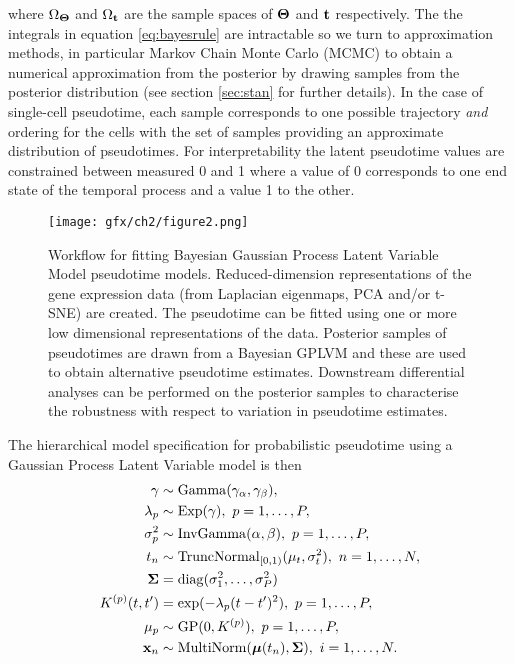 where $\Omega_{\bm{\Theta}}$ and $\Omega_{\mathbf{t}}$ are the sample spaces of $\bm{\Theta}$ and $\mathbf{t}$ respectively. The the integrals in equation \ref{eq:bayesrule} are intractable so we turn to approximation methods, in particular Markov Chain Monte Carlo (MCMC) to obtain a numerical approximation from the posterior by drawing samples from the posterior distribution (see section \ref{sec:stan} for further details). In the case of single-cell pseudotime, each sample corresponds to one possible trajectory \emph{and} ordering for the cells with the set of samples providing an approximate distribution of pseudotimes. For interpretability the latent pseudotime values are constrained between measured 0 and 1 where a value of 0 corresponds to one end state of the temporal process and a value 1 to the other.

\begin{figure}
\centering
  \texttt{[image: gfx/ch2/figure2.png]}
  \caption[Workflow for fitting Bayesian Gaussian Process Latent Variable Model pseudotime models.]{Workflow for fitting Bayesian Gaussian Process Latent Variable Model pseudotime models. Reduced-dimension representations of the gene expression data (from Laplacian eigenmaps, PCA and/or t-SNE) are created. The pseudotime can be fitted using one or more low dimensional representations of the data. Posterior samples of pseudotimes are drawn from a Bayesian GPLVM and these are used to obtain alternative pseudotime estimates. Downstream differential analyses can be performed on the posterior samples to characterise the robustness with respect to variation in pseudotime estimates.} \label{fig:workflow}
\end{figure}

The hierarchical model specification for probabilistic pseudotime using a Gaussian Process Latent Variable model is then
\begin{equation} \label{eq:model}
\begin{aligned}
	\gamma & \sim \mathrm{Gamma}(\gamma_\alpha, \gamma_\beta), \\
	\lambda_p & \sim  \mathrm{Exp(\gamma)}, ~p=1,\dots, P, \\
	 \sigma_p^2 & \sim   \mathrm{InvGamma}(\alpha, \beta), ~p=1,\dots, P, \\
	t_n & \sim
			\mathrm{TruncNormal}_{[0, 1)}(\mu_t, \sigma_t^2), ~n=1,\dots,N,\\
	{\bm \Sigma} & =  \mathrm{diag}(\sigma_1^2, \dots, \sigma_P^2) \\
	K^{(p)}(t, t') & = \exp( -\lambda_p (t-t')^2 ), ~p=1,\dots, P, \\
	\mu_p &\sim  \mathrm{GP}(0, K^{(p)}), ~ p=1,\dots,P,  \\
	\mathbf{x}_{n} & \sim  \mathrm{MultiNorm}( \bm{\mu}(t_n), \bm{\Sigma} ), ~i=1,\dots,N.
\end{aligned}
\end{equation}\label{eq:pseudogp_model}

